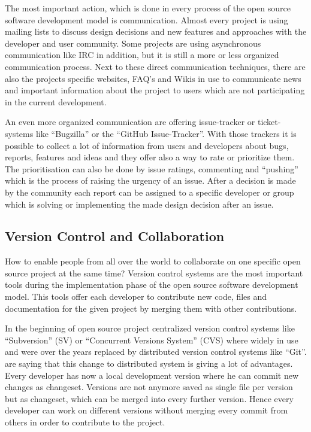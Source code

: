 \documentclass[DIV=calc,paper=a4,fontsize=9pt,twocolumn]{scrartcl}
\begin{document}
The most important action, which is done in every process of the open source software development model is communication. Almost every project is using mailing lists to discuss design decisions and new features and approaches with the developer and user community. Some projects are using asynchronous communication like IRC in addition, but it is still a more or less organized communication process. Next to these direct communication techniques, there are also the projects specific websites, FAQ's and Wikis in use to communicate news and important information about the project to users which are not participating in the current development. \citep{ApacheFoundation13} 

An even more organized communication are offering issue-tracker or ticket-systems like \enquote{Bugzilla} or the \enquote{GitHub Issue-Tracker}. With those trackers it is possible to collect a lot of information from users and developers about bugs, reports, features and ideas and they offer also a way to rate or prioritize them. The prioritisation can also be done by issue ratings, commenting and \enquote{pushing} which is the process of raising the urgency of an issue. After a decision is made by the community each report can be assigned to a specific developer or group which is solving or implementing the made design decision after an issue.

\subsection{Version Control and Collaboration}

How to enable people from all over the world to collaborate on one specific open source project at the same time? Version control systems are the most important tools during the implementation phase of the open source software development model. This tools offer each developer to contribute new code, files and documentation for the given project by merging them with other contributions. 

In the beginning of open source project centralized version control systems like \enquote{Subversion} (SV) or \enquote{Concurrent Versions System} (CVS) where widely in use and were over the years replaced by distributed version control systems like \enquote{Git}. \citet{rodriguez2012distributed} are saying that this change to distributed system is giving a lot of advantages. Every developer has now a local development version where he can commit new changes as changeset. Versions are not anymore saved as single file per version but as changeset, which can be merged into every further version. Hence every developer can work on different versions without merging every commit from others in order to contribute to the project.
\end{document}
